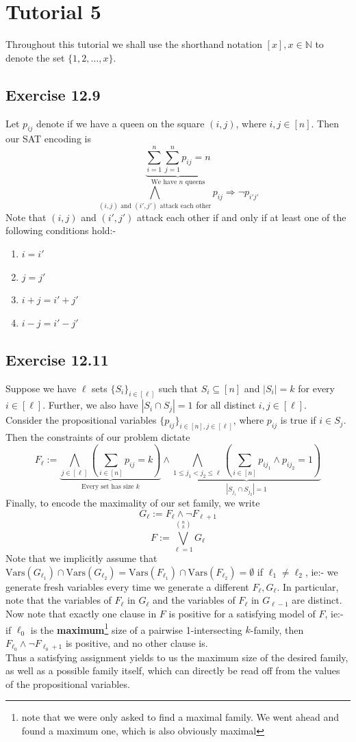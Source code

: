 \documentclass{article}
\newcommand{\Vars}{\mathrm{Vars}}
\begin{document}
\section{Tutorial 5}
Throughout this tutorial we shall use the shorthand notation $[x], x\in\mathbb{N}$ to denote the set $\{1, 2, \ldots, x\}$.
\subsection*{Exercise 12.9}
Let $p_{ij}$ denote if we have a queen on the square $(i, j)$, where $i, j\in [n]$. Then our SAT encoding is
$$\underbrace{\sum_{i = 1}^n\sum_{j = 1}^n p_{ij} = n}_{\text{We have $n$ queens}}$$
$$\bigwedge_{\text{$(i, j)$ and $(i', j')$ attack each other}} p_{ij}\Rightarrow\lnot p_{i'j'}$$
Note that $(i, j)$ and $(i', j')$ attack each other if and only if at least one of the following conditions hold:-
\begin{enumerate}
    \item $i = i'$
    \item $j = j'$
    \item $i + j = i' + j'$
    \item $i - j = i' - j'$
\end{enumerate}
\subsection*{Exercise 12.11}
Suppose we have $\ell$ sets $\{S_i\}_{i\in[\ell]}$ such that $S_i\subseteq[n]$ and $|S_i| = k$ for every $i\in [\ell]$. Further, we also have $|S_i\cap S_j| = 1$ for all distinct $i, j\in[\ell]$.\\
Consider the propositional variables $\{p_{ij}\}_{i\in [n], j\in [\ell]}$, where $p_{ij}$ is true if $i\in S_j$. Then the constraints of our problem dictate 
$$F_\ell := \underbrace{\bigwedge_{j\in [\ell]}\left(\sum_{i\in[n]}p_{ij} = k\right)}_{\text{Every set has size $k$}}\wedge\underbrace{\bigwedge_{1\leq j_1 < j_2 \leq\ell}\left(\sum_{i\in [n]}p_{ij_1}\wedge p_{ij_2} = 1\right)}_{|S_{j_1}\cap S_{j_2}| = 1}$$
Finally, to encode the maximality of our set family, we write 
$$G_\ell := F_\ell\wedge\lnot F_{\ell + 1}$$
$$F := \bigvee_{\ell = 1}^{\binom{n}{k}} G_\ell$$
Note that we implicitly assume that $\Vars(G_{\ell_1})\cap\Vars(G_{\ell_2}) = \Vars(F_{\ell_1})\cap\Vars(F_{\ell_2}) = \emptyset$ if $\ell_1\neq \ell_2$, ie:- we generate fresh variables every time we generate a different $F_\ell, G_\ell$. In particular, note that the variables of $F_\ell$ in $G_{\ell}$ and the variables of $F_\ell$ in $G_{\ell - 1}$ are distinct. \\
Now note that exactly one clause in $F$ is positive for a satisfying model of $F$, ie:- if $\ell_0$ is the \textbf{maximum}\footnote{note that we were only asked to find a maximal family. We went ahead and found a maximum one, which is also obviously maximal} size of a pairwise 1-intersecting $k$-family, then $F_{\ell_0}\wedge\lnot F_{\ell_0 + 1}$ is positive, and no other clause is.\\
Thus a satisfying assignment yields to us the maximum size of the desired family, as well as a possible family itself, which can directly be read off from the values of the propositional variables.
\end{document}
